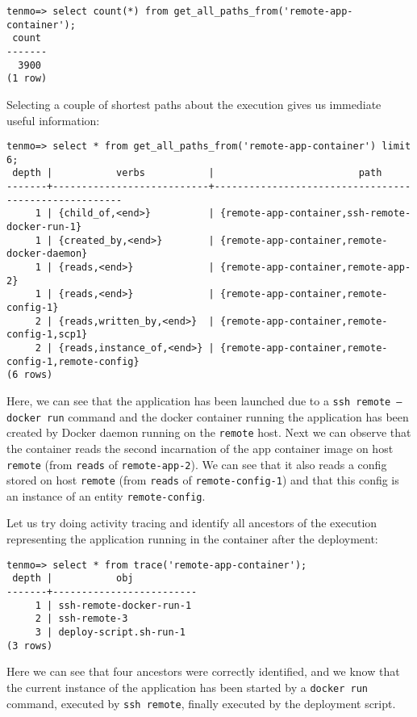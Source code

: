 \begin{verbatim}
tenmo=> select count(*) from get_all_paths_from('remote-app-container');
 count 
-------
  3900
(1 row)
\end{verbatim}

Selecting a couple of shortest paths about the execution gives us immediate useful information:
%
\begin{verbatim}
tenmo=> select * from get_all_paths_from('remote-app-container') limit 6;
 depth |           verbs           |                         path                         
-------+---------------------------+------------------------------------------------------
     1 | {child_of,<end>}          | {remote-app-container,ssh-remote-docker-run-1}
     1 | {created_by,<end>}        | {remote-app-container,remote-docker-daemon}
     1 | {reads,<end>}             | {remote-app-container,remote-app-2}
     1 | {reads,<end>}             | {remote-app-container,remote-config-1}
     2 | {reads,written_by,<end>}  | {remote-app-container,remote-config-1,scp1}
     2 | {reads,instance_of,<end>} | {remote-app-container,remote-config-1,remote-config}
(6 rows)
\end{verbatim}
%
Here, we can see that the application has been launched due to a \texttt{ssh remote -- docker run} command and the docker container running the application has been created by Docker daemon running on the \texttt{remote} host. Next we can observe that the container reads the second incarnation of the app container image on host \texttt{remote} (from \texttt{reads} of \texttt{remote-app-2}). We can see that it also reads a config stored on host \texttt{remote} (from \texttt{reads} of \texttt{remote-config-1}) and that this config is an instance of an entity \texttt{remote-config}.

Let us try doing activity tracing and identify all ancestors of the execution representing the application running in the container after the deployment:
\begin{verbatim}
tenmo=> select * from trace('remote-app-container');
 depth |           obj           
-------+-------------------------
     1 | ssh-remote-docker-run-1
     2 | ssh-remote-3
     3 | deploy-script.sh-run-1
(3 rows)
\end{verbatim}
%
Here we can see that four ancestors were correctly identified, and we know that the current instance of the application has been started by a \texttt{docker run} command, executed by \texttt{ssh remote}, finally executed by the deployment script.

